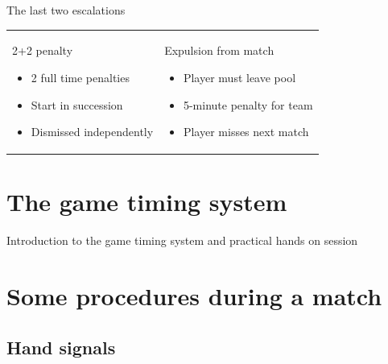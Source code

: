 \documentclass{beamer}
\begin{document}
    \begin{frame}{The last two escalations}
        \begin{tabular}{ll}
            \parbox{0.5\textwidth}
            {
                \begin{center}
                    2+2 penalty
                \end{center}
                \begin{itemize}
                    \item 2 full time penalties
                    \item Start in succession
                    \item Dismissed independently
                \end{itemize}
            }
            &
            \parbox{0.5\textwidth}
            {
                \begin{center}
                    Expulsion from match
                \end{center}
                \begin{itemize}
                    \item Player must leave pool
                    \item 5-minute penalty for team
                    \item Player misses next match
                \end{itemize}
            }
        \end{tabular}
    \end{frame}

    \section{The game timing system}
    \begin{frame}
        \begin{center}
            Introduction to the game timing system and practical hands on session
        \end{center}
    \end{frame}

    \section{Some procedures during a match}
    \subsection{Hand signals}
\end{document}
